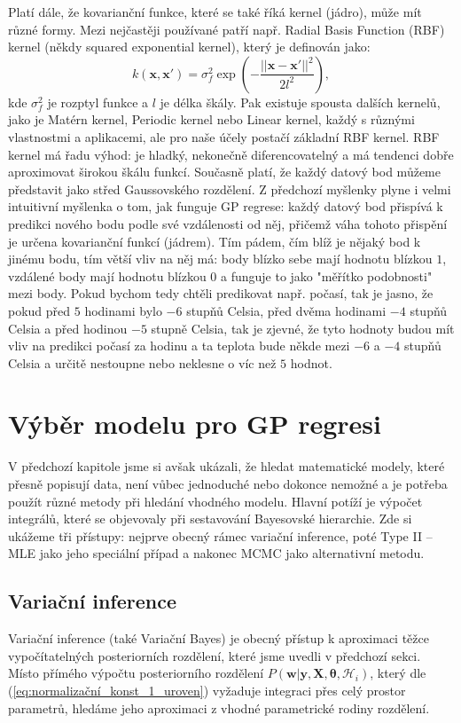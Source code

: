 Platí dále, že kovarianční funkce, které se také říká kernel (jádro), může mít různé formy.
Mezi nejčastěji používané patří např. Radial Basis Function (RBF) kernel (někdy squared exponential kernel), který je definován jako:
\begin{equation}
  k(\mathbf{x}, \mathbf{x'}) = \sigma_f^2 \exp\left( -\frac{||\mathbf{x} - \mathbf{x'}||^2}{2l^2} \right),
\end{equation}
kde $\sigma_f^2$ je rozptyl funkce a $l$ je délka škály.
Pak existuje spousta dalších kernelů, jako je Matérn kernel, Periodic kernel nebo Linear kernel, každý s různými vlastnostmi a aplikacemi, ale pro naše účely postačí základní RBF kernel.
RBF kernel má řadu výhod: je hladký, nekonečně diferencovatelný a má tendenci dobře aproximovat širokou škálu funkcí.
Současně platí, že každý datový bod můžeme představit jako střed Gaussovského rozdělení.
Z předchozí myšlenky plyne i velmi intuitivní myšlenka o tom, jak funguje GP regrese: každý datový bod přispívá k predikci nového bodu podle své vzdálenosti od něj, přičemž váha tohoto přispění je určena kovarianční funkcí (jádrem).
Tím pádem, čím blíž je nějaký bod k jinému bodu, tím větší vliv na něj má: body blízko sebe mají hodnotu blízkou $1$, vzdálené body mají hodnotu blízkou $0$ a funguje to jako "měřítko podobnosti" mezi body.
Pokud bychom tedy chtěli predikovat např. počasí, tak je jasno, že pokud před $5$ hodinami bylo $-6$ stupňů Celsia, před dvěma hodinami $-4$ stupňů Celsia a před hodinou $-5$ stupně Celsia, tak je zjevné, že tyto hodnoty budou mít vliv na predikci počasí za hodinu a ta teplota bude někde mezi $-6$ a $-4$ stupňů Celsia a určitě nestoupne nebo neklesne o víc než $5$ hodnot.
\par

\section{Výběr modelu pro GP regresi}
V předchozí kapitole jsme si avšak ukázali, že hledat matematické modely, které přesně popisují data, není vůbec jednoduché nebo dokonce nemožné a je potřeba použít různé metody při hledání vhodného modelu.
Hlavní potíží je výpočet integrálů, které se objevovaly při sestavování Bayesovské hierarchie.
Zde si ukážeme tři přístupy: nejprve obecný rámec variační inference, poté Type II – MLE jako jeho speciální případ a nakonec MCMC jako alternativní metodu.

\subsection{Variační inference}
Variační inference (také Variační Bayes) je obecný přístup k aproximaci těžce vypočítatelných posteriorních rozdělení, které jsme uvedli v předchozí sekci.
Místo přímého výpočtu posteriorního rozdělení $P(\mathbf{w} | \mathbf{y}, \mathbf{X}, \boldsymbol{\theta}, \mathcal{H}_i)$, který dle (\ref{eq:normalizační_konst_1_uroven}) vyžaduje integraci přes celý prostor parametrů, hledáme jeho aproximaci z vhodné parametrické rodiny rozdělení.
\par

